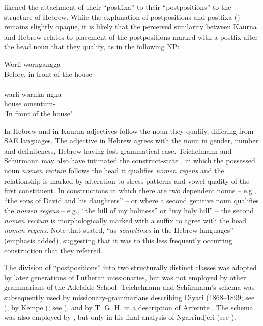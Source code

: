 \citet[21]{teichelmann_outlines_1840} likened the attachment of their “postfixa” to their “postpositions” to the structure of Hebrew. While the explanation of postpositions and postfixa () remains slightly opaque, it is likely that the perceived similarity between Kaurna and Hebrew relates to placement of the postpositions marked with a postfix after the head noun that they qualify, as in the following NP:

\ea\label{ex:5:9}
Worli    worngangga \\
Before, in front of the house \\
\citep{teichelmann_dictionary_1857} \\
\gll warli warnka-ngka \\
house   omentum- \\
\glt `In front of the house'
\z

In Hebrew and in Kaurna adjectives follow the noun they qualify, differing from SAE languages. The adjective in Hebrew agrees with the noun in gender, number and definiteness, Hebrew having lost grammatical case. Teichelmann and Schürmann may also have intimated the construct-state \citep[247]{gesenius_gesenius_1910}, in which the possessed noun \textit{nomen rectum} follows the head it qualifies \textit{nomen regens} and the relationship is marked by alteration to stress patterns and vowel quality of the first constituent. In constructions in which there are two dependent nouns -- e.g., “the sons of David and his daughters” \citep[414]{gesenius_gesenius_1910} -- or where a second genitive noun qualifies the \textit{nomen regens} -- e.g., “the hill of my holiness” or “my holy hill” \citep[50]{weingreen_construct-genitive_1954} -- the second \textit{nomen rectum} is morphologically marked with a suffix to agree with the head \textit{nomen regens}. Note that \citep[21]{teichelmann_outlines_1840} stated, ``as \textit{sometimes} in the Hebrew languages'' (emphasis added), suggesting that it was to this less frequently occurring construction that they referred. 

The division of “postpositions” into two structurally distinct classes was adop\-ted by later generations of Lutheran missionaries, but was not employed by other grammarians of the Adelaide School. Teichelmann and Schürmann’s schema was subsequently used by missionary-grammarians describing Diyari (1868--1899; see ), by Kempe (\citealt{kempe_grammar_1891}; see ), and by T. G. H. \citet{strehlow_aranda_1944} in a description of Arrernte \citep{Stockigt2021a}. The schema was also employed by \citet[8]{taplin_grammar_1878}, but only in his final analysis of Ngarrindjeri (see ).

